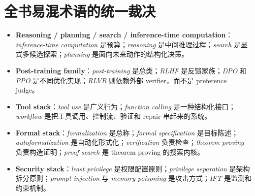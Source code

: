 \section{全书易混术语的统一裁决}

\begin{itemize}
\item \textbf{Reasoning / planning / search / inference-time computation}：\emph{inference-time computation} 是预算；\emph{reasoning} 是中间推理过程；\emph{search} 是显式多候选探索；\emph{planning} 是面向未来动作的结构化决策。
\item \textbf{Post-training family}：\emph{post-training} 是总类；\emph{RLHF} 是反馈家族；\emph{DPO} 和 \emph{PPO} 是不同优化实现；\emph{RLVR} 则依赖外部 verifier，而不是 preference judge。
\item \textbf{Tool stack}：\emph{tool use} 是广义行为；\emph{function calling} 是一种结构化接口；\emph{workflow} 是把工具调用、控制流、验证和 repair 串起来的系统。
\item \textbf{Formal stack}：\emph{formalization} 是总称；\emph{formal specification} 是目标陈述；\emph{autoformalization} 是自动化形式化；\emph{verification} 负责检查；\emph{theorem proving} 负责构造证明；\emph{proof search} 是 theorem proving 的搜索内核。
\item \textbf{Security stack}：\emph{least privilege} 是权限配置原则；\emph{privilege separation} 是架构拆分原则；\emph{prompt injection} 与 \emph{memory poisoning} 是攻击方式；\emph{IFT} 是监测和约束机制。
\end{itemize}
